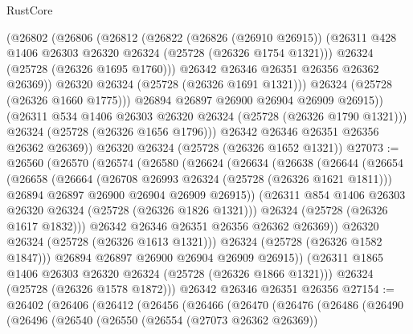 \begin{lexlean}{RustCore}
\begin{coremodule}
                (@26802
                  (@26806
                    (@26812
                      (@26822
                        (@26826 (@26910 @26915))
                        (@26311 @428 @1406 @26303 @26320 @26324 (@25728 (@26326 @1754 @1321)))
                        @26324
                        (@25728 (@26326 @1695 @1760)))
                      @26342
                      @26346
                      @26351
                      @26356
                      @26362
                      @26369))
                  @26320
                  @26324
                  (@25728 (@26326 @1691 @1321)))
                @26324
                (@25728 (@26326 @1660 @1775)))
              @26894
              @26897
              @26900
              @26904
              @26909
              @26915))
          (@26311 @534 @1406 @26303 @26320 @26324 (@25728 (@26326 @1790 @1321)))
          @26324
          (@25728 (@26326 @1656 @1796)))
        @26342
        @26346
        @26351
        @26356
        @26362
        @26369))
    @26320
    @26324
    (@25728 (@26326 @1652 @1321))
@27073 := @26560
    (@26570
      (@26574
        (@26580
          (@26624
            (@26634
              (@26638
                (@26644
                  (@26654
                    (@26658
                      (@26664
                        (@26708 @26993 @26324 (@25728 (@26326 @1621 @1811)))
                        @26894
                        @26897
                        @26900
                        @26904
                        @26909
                        @26915))
                    (@26311 @854 @1406 @26303 @26320 @26324 (@25728 (@26326 @1826 @1321)))
                    @26324
                    (@25728 (@26326 @1617 @1832)))
                  @26342
                  @26346
                  @26351
                  @26356
                  @26362
                  @26369))
              @26320
              @26324
              (@25728 (@26326 @1613 @1321)))
            @26324
            (@25728 (@26326 @1582 @1847)))
          @26894
          @26897
          @26900
          @26904
          @26909
          @26915))
      (@26311 @1865 @1406 @26303 @26320 @26324 (@25728 (@26326 @1866 @1321)))
      @26324
      (@25728 (@26326 @1578 @1872)))
    @26342
    @26346
    @26351
    @26356
@27154 := @26402
    (@26406
      (@26412
        (@26456
          (@26466
            (@26470
              (@26476
                (@26486
                  (@26490
                    (@26496
                      (@26540
                        (@26550
                          (@26554 (@27073 @26362 @26369))

\end{coremodule}
\end{lexlean}
